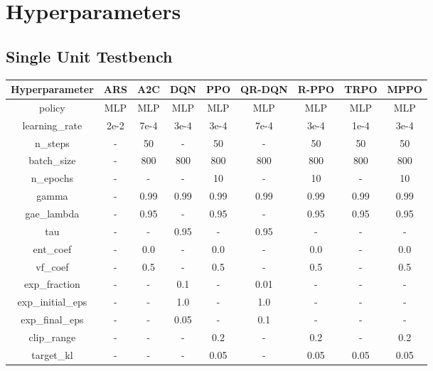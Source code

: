 \chapter{Hyperparameters}
\label{appx:hyperparams}

\section{Single Unit Testbench}
\label{app:a}

\begin{table}[htbp]
    \centering
    \begin{tabular}{|c|c|c|c|c|c|c|c|c|}
        \hline
        \textbf{Hyperparameter} & \textbf{ARS} & \textbf{A2C} & \textbf{DQN} & \textbf{PPO} & \textbf{QR-DQN} & \textbf{R-PPO} & \textbf{TRPO} & \textbf{MPPO} \\
        \hline
        policy & MLP & MLP & MLP & MLP & MLP & MLP & MLP & MLP \\
        \hline
        learning\_rate & 2e-2 & 7e-4 & 3e-4 & 3e-4 & 7e-4 & 3e-4 & 1e-4 & 3e-4 \\
        \hline
        n\_steps & - & 50 & - & 50 & - & 50 & 50 & 50 \\
        \hline
        batch\_size & - & 800 & 800 & 800 & 800 & 800 & 800 & 800 \\
        \hline
        n\_epochs & - & - & - & 10 & - & 10 & - & 10 \\
        \hline
        gamma & - & 0.99 & 0.99 & 0.99 & 0.99 & 0.99 & 0.99 & 0.99 \\
        \hline
        gae\_lambda & - & 0.95 & - & 0.95 & - & 0.95 & 0.95 & 0.95 \\
        \hline
        tau & - & - & 0.95 & - & 0.95 & - & - & - \\
        \hline
        ent\_coef & - & 0.0 & - & 0.0 & - & 0.0 & - & 0.0 \\
        \hline
        vf\_coef & - & 0.5 & - & 0.5 & - & 0.5 & - & 0.5 \\
        \hline
        exp\_fraction & - & - & 0.1 & - & 0.01 & - & - & - \\
        \hline
        exp\_initial\_eps & - & - & 1.0 & - & 1.0 & - & - & - \\
        \hline
        exp\_final\_eps & - & - & 0.05 & - & 0.1 & - & - & - \\
        \hline
        clip\_range & - & - & - & 0.2 & - & 0.2 & - & 0.2 \\
        \hline
        target\_kl & - & - & - & 0.05 & - & 0.05 & 0.05 & 0.05 \\

\end{tabular}
\end{table}
